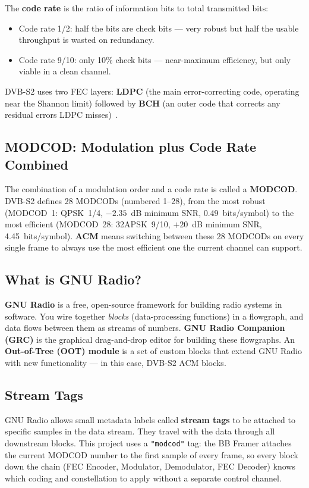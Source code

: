 \documentclass[12pt,a4paper]{report}
\begin{document}
The \textbf{code rate} is the ratio of information bits to total transmitted bits:
\begin{itemize}
    \item Code rate 1/2: half the bits are check bits --- very robust but half the
          usable throughput is wasted on redundancy.
    \item Code rate 9/10: only 10\% check bits --- near-maximum efficiency, but
          only viable in a clean channel.
\end{itemize}
DVB-S2 uses two FEC layers: \textbf{LDPC} (the main error-correcting code,
operating near the Shannon limit) followed by \textbf{BCH} (an outer code that
corrects any residual errors LDPC misses)~\cite{etsi_dvbs2}.

\subsection*{MODCOD: Modulation plus Code Rate Combined}

The combination of a modulation order and a code rate is called a \textbf{MODCOD}.
DVB-S2 defines 28 MODCODs (numbered 1--28), from the most robust
(MODCOD~1: QPSK~1/4, $-2.35$~dB minimum SNR, 0.49~bits/symbol) to the most
efficient (MODCOD~28: 32APSK~9/10, $+20$~dB minimum SNR, 4.45~bits/symbol).
\textbf{ACM} means switching between these 28 MODCODs on every single frame to
always use the most efficient one the current channel can support.

\subsection*{What is GNU Radio?}

\textbf{GNU Radio} is a free, open-source framework for building radio systems in
software.  You wire together \emph{blocks} (data-processing functions) in a
flowgraph, and data flows between them as streams of numbers.  \textbf{GNU Radio
Companion (GRC)} is the graphical drag-and-drop editor for building these
flowgraphs.  An \textbf{Out-of-Tree (OOT) module} is a set of custom blocks that
extend GNU Radio with new functionality --- in this case, DVB-S2 ACM blocks.

\subsection*{Stream Tags}

GNU Radio allows small metadata labels called \textbf{stream tags} to be attached
to specific samples in the data stream.  They travel with the data through all
downstream blocks.  This project uses a \texttt{"modcod"} tag: the BB Framer
attaches the current MODCOD number to the first sample of every frame, so every
block down the chain (FEC Encoder, Modulator, Demodulator, FEC Decoder) knows
which coding and constellation to apply without a separate control channel.
\end{document}
